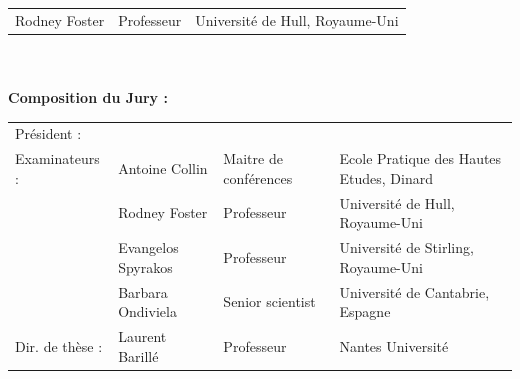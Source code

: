 \documentclass[
  letterpaper,
  11pt,
  english,
  singlespacing,
  headsepline]{MastersDoctoralThesis}
\begin{document}
\begin{titlepage}
\begin{tabular}{@{}l l l@{}}
    {\fontsize{10}{14}\selectfont \textcolor{textgray}{Rodney Foster}} & 
    {\fontsize{10}{14}\selectfont \textcolor{textgray}{Professeur}} & 
    {\fontsize{10}{14}\selectfont \textcolor{textgray}{Université de Hull, Royaume-Uni}} \\
\end{tabular}\\\\

{\fontsize{12}{16}\selectfont \textbf{Composition du Jury : }}

\begin{tabular}{@{}l l l l@{}}
    {\fontsize{10}{14}\selectfont \textcolor{textgray}{Président :}} & 
    {\fontsize{10}{14}\selectfont \textcolor{textgray}{ }} & 
    {\fontsize{10}{14}\selectfont \textcolor{textgray}{ }} & 
    {\fontsize{10}{14}\selectfont \textcolor{textgray}{ }} \\

    {\fontsize{10}{14}\selectfont \textcolor{textgray}{Examinateurs :}} & 
    {\fontsize{10}{14}\selectfont \textcolor{textgray}{Antoine Collin}} & 
    {\fontsize{10}{14}\selectfont \textcolor{textgray}{Maitre de conférences}} & 
    {\fontsize{10}{14}\selectfont \textcolor{textgray}{Ecole Pratique des Hautes Etudes, Dinard}} \\
    
    {\fontsize{10}{14}\selectfont \textcolor{textgray}{}} & 
    {\fontsize{10}{14}\selectfont \textcolor{textgray}{Rodney Foster}} & 
    {\fontsize{10}{14}\selectfont \textcolor{textgray}{Professeur}} & 
    {\fontsize{10}{14}\selectfont \textcolor{textgray}{Université de Hull, Royaume-Uni}} \\

    {\fontsize{10}{14}\selectfont \textcolor{textgray}{}} & 
    {\fontsize{10}{14}\selectfont \textcolor{textgray}{Evangelos Spyrakos}} & 
    {\fontsize{10}{14}\selectfont \textcolor{textgray}{Professeur}} & 
    {\fontsize{10}{14}\selectfont \textcolor{textgray}{Université de Stirling, Royaume-Uni}} \\

    {\fontsize{10}{14}\selectfont \textcolor{textgray}{}} & 
    {\fontsize{10}{14}\selectfont \textcolor{textgray}{Barbara Ondiviela}} & 
    {\fontsize{10}{14}\selectfont \textcolor{textgray}{Senior scientist}} & 
    {\fontsize{10}{14}\selectfont \textcolor{textgray}{Université de Cantabrie, Espagne}} \\

    {\fontsize{10}{14}\selectfont \textcolor{textgray}{Dir. de thèse :}} & 
    {\fontsize{10}{14}\selectfont \textcolor{textgray}{Laurent Barillé}} & 
    {\fontsize{10}{14}\selectfont \textcolor{textgray}{Professeur}} & 
    {\fontsize{10}{14}\selectfont \textcolor{textgray}{Nantes Université}} \\


\end{tabular}
\end{titlepage}
\end{document}
